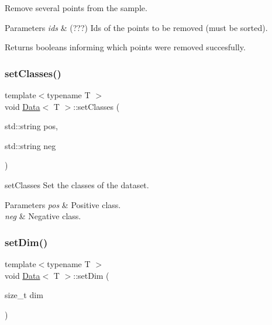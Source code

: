 Remove several points from the sample. 


\begin{DoxyParams}{Parameters}
{\em ids} & (???) Ids of the points to be removed (must be sorted). \\
\hline
\end{DoxyParams}
\begin{DoxyReturn}{Returns}
booleans informing which points were removed succesfully. 
\end{DoxyReturn}
\mbox{\label{class_data_a6d29f9fc923c3f7c258b93330130f056}} 
\subsubsection{\texorpdfstring{set\+Classes()}{setClasses()}}
{\footnotesize\ttfamily template$<$typename T $>$ \\
void \mbox{\hyperlink{class_data}{Data}}$<$ T $>$\+::set\+Classes (\begin{DoxyParamCaption}\item[{std\+::string}]{pos,  }\item[{std\+::string}]{neg }\end{DoxyParamCaption})}



set\+Classes Set the classes of the dataset. 


\begin{DoxyParams}{Parameters}
{\em pos} & Positive class. \\
\hline
{\em neg} & Negative class. \\
\hline
\end{DoxyParams}
\mbox{\label{class_data_ad6e602802e593e4700b3746de55f890b}} 
\subsubsection{\texorpdfstring{set\+Dim()}{setDim()}}
{\footnotesize\ttfamily template$<$typename T $>$ \\
void \mbox{\hyperlink{class_data}{Data}}$<$ T $>$\+::set\+Dim (\begin{DoxyParamCaption}\item[{size\+\_\+t}]{dim }\end{DoxyParamCaption})}




